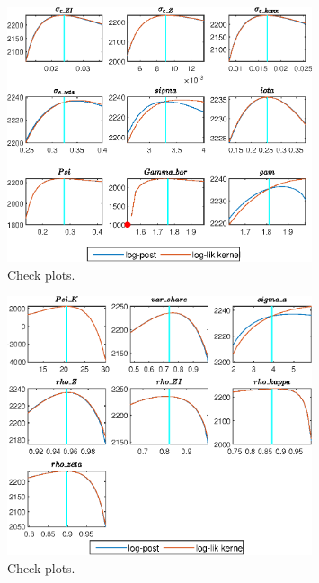  
\begin{figure}[H]
\centering 
\includegraphics[width=0.80\textwidth]{directed_search_est/graphs/directed_search_est_CheckPlots1}
\caption{Check plots.}\label{Fig:CheckPlots:1}
\end{figure}
 
\begin{figure}[H]
\centering 
\includegraphics[width=0.80\textwidth]{directed_search_est/graphs/directed_search_est_CheckPlots2}
\caption{Check plots.}\label{Fig:CheckPlots:2}
\end{figure}
 

